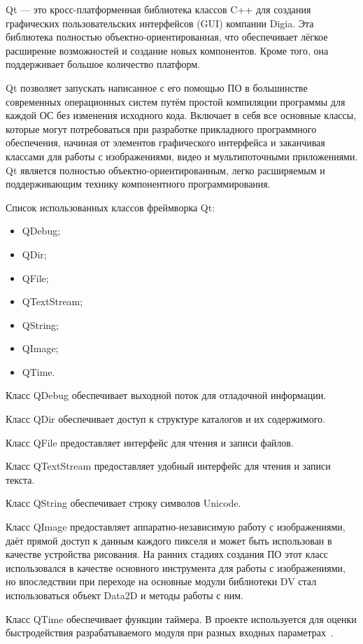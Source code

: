 Qt --- это кросс-платформенная библиотека классов C++ для создания графических пользовательских интерфейсов (GUI) компании Digia. Эта библиотека полностью объектно-ориентированная, что обеспечивает лёгкое расширение возможностей и создание новых компонентов. Кроме того, она поддерживает большое количество платформ.

Qt позволяет запускать написанное с его помощью ПО в большинстве современных операционных систем путём простой компиляции программы для каждой ОС без изменения исходного кода. Включает в себя все основные классы, которые могут потребоваться при разработке прикладного программного обеспечения, начиная от элементов графического интерфейса и заканчивая классами для работы с изображениями, видео и мультипоточными приложениями. Qt является полностью объектно-ориентированным, легко расширяемым и поддерживающим технику компонентного программирования.

Список использованных классов фреймворка Qt:
\begin{itemize}
\item QDebug;
\item QDir;
\item QFile;
\item QTextStream;
\item QString;
\item QImage;
\item QTime.
\end{itemize}

Класс QDebug обеспечивает выходной поток для отладочной информации.

Класс QDir обеспечивает доступ к структуре каталогов и их содержимого.

Класс QFile предоставляет интерфейс для чтения и записи файлов.

Класс QTextStream предоставляет удобный интерфейс для чтения и записи текста.

Класс QString обеспечивает строку символов Unicode.

Класс QImage предоставляет аппаратно-независимую работу с изображениями, даёт прямой доступ к данным каждого пикселя и может быть использован в качестве устройства рисования. На ранних стадиях создания ПО этот класс использовался в качестве основного инструмента для работы с изображениями, но впоследствии при переходе на основные модули библиотеки DV стал использоваться объект Data2D и методы работы с ним.

Класс QTime обеспечивает функции таймера. В проекте используется для оценки быстродействия разрабатываемого модуля при разных входных параметрах~\cite{qt}.

